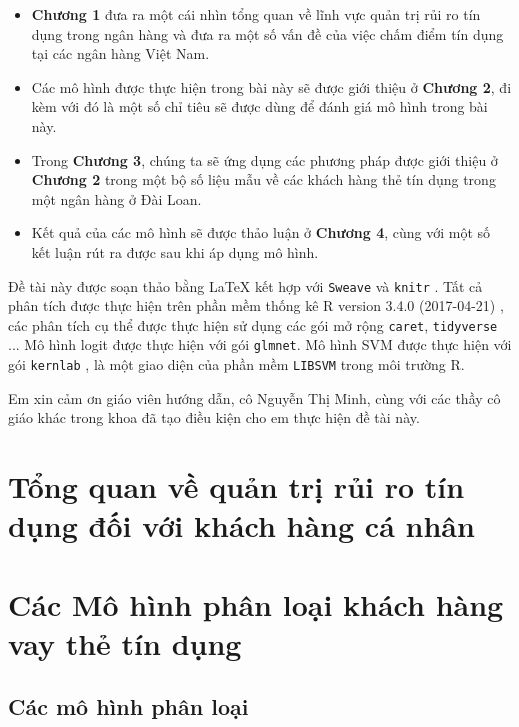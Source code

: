 \documentclass[a4paper]{report}\usepackage[]{graphicx}\usepackage[]{color}
\begin{document}
\begin{itemize}
\item \textbf{Chương 1} đưa ra một cái nhìn tổng quan về lĩnh vực quản trị rủi ro tín dụng trong ngân hàng và đưa ra một số vấn đề của việc chấm điểm tín dụng tại các ngân hàng Việt Nam.
\item Các mô hình được thực hiện trong bài này sẽ được giới thiệu ở \textbf{Chương 2}, đi kèm với đó là một số chỉ tiêu sẽ được dùng để đánh giá mô hình trong bài này.
\item Trong \textbf{Chương 3}, chúng ta sẽ ứng dụng các phương pháp được giới thiệu ở \textbf{Chương 2} trong một bộ số liệu mẫu về các khách hàng thẻ tín dụng trong một ngân hàng ở Đài Loan.
\item Kết quả của các mô hình sẽ được thảo luận ở \textbf{Chương 4}, cùng với một số kết luận rút ra được sau khi áp dụng mô hình.
\end{itemize}

Đề tài này được soạn thảo bằng \LaTeX{} kết hợp với \texttt{Sweave} và \texttt{knitr} 
\parencite{r:knitr}. Tất cả phân tích được thực hiện trên phần mềm thống kê 
R version 3.4.0 (2017-04-21) \parencite{r:rbase},  
các phân tích cụ thể được thực hiện sử dụng các gói mở rộng \texttt{caret}\parencite{r:caret}, \texttt{tidyverse} \parencite{r:tidyverse}... Mô hình logit được thực hiện với gói \texttt{glmnet}\parencite{r:glmnet}. 
Mô hình SVM được thực hiện với gói \texttt{kernlab} \parencite{r:kernlab}, là một giao diện của phần mềm \texttt{LIBSVM} \parencite{CC01a} trong môi trường R.

Em xin cảm ơn giáo viên hướng dẫn, cô Nguyễn Thị Minh, cùng với các thầy cô giáo khác trong khoa đã tạo điều kiện cho em thực hiện đề tài này.


\chapter{Tổng quan về quản trị rủi ro tín dụng đối với khách hàng cá nhân}



\chapter{Các Mô hình phân loại khách hàng vay thẻ tín dụng}
\section{Các mô hình phân loại}
\end{document}
